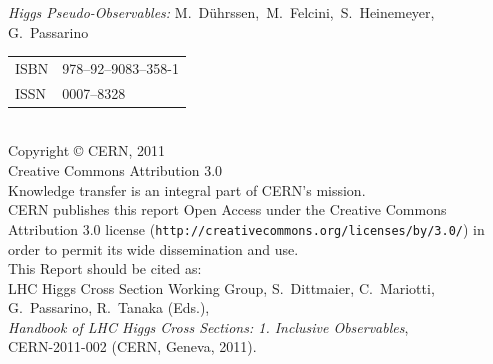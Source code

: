 \noindent\emph{Higgs Pseudo-Observables:} 	
         M.~D\"uhrssen,\, 	
         M.~Felcini,\, 	  	
         S.~Heinemeyer,\, 	
         G.~Passarino 


\vfill%
\begin{flushleft}%
\begin{tabular}{@{}l@{~}l}
  ISBN & 978--92--9083--358-1 \\%
  ISSN & 0007--8328\\ %
\end{tabular}\\[1mm]
Copyright \copyright{} CERN, 2011\\[1mm]
 Creative Commons Attribution 3.0\\[1mm]
Knowledge transfer is an integral part of CERN's mission.\\[1mm]
CERN publishes this report Open Access under the Creative Commons
Attribution 3.0 license (\texttt{http://creativecommons.org/licenses/by/3.0/})
in order to permit its wide dissemination and use.\\[3mm]
This Report should be cited as:\\[1mm]
LHC Higgs Cross Section Working Group,
S.~Dittmaier, C.~Mariotti, G.~Passarino, R.~Tanaka (Eds.), \\
\emph{Handbook of LHC Higgs Cross Sections: 1. Inclusive Observables}, \\
CERN-2011-002 (CERN, Geneva, 2011).\\[3mm]
\end{flushleft}
\endinput

